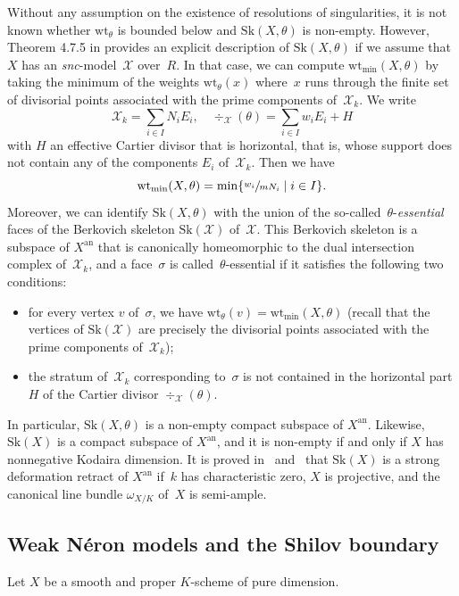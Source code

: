 \documentclass[11pt]{article}
\theoremstyle{definition}
\numberwithin{equation}{subsection}
\newcommand{\cX}{\ensuremath{\mathscr{X}}}
\newcommand{\snc}{\textit{snc}}
\newcommand{\an}{\mathrm{an}}
\newcommand{\Sk}{\mathrm{Sk}}
\newcommand{\wt}{\mathrm{wt}}
\let\form\theta
\begin{document}
Without any assumption on the existence of resolutions of singularities, it is not known whether $\wt_{\form}$ is bounded below and $\Sk(X,\form)$ is non-empty.
However, Theorem 4.7.5 in \cite{MuNi} provides an explicit description of $\Sk(X,\form)$ if we assume that $X$ has an \snc-model~$\cX$ over~$R$.
In that case, we can compute $\wt_{\min}(X,\form)$ by taking the minimum of the weights $\wt_{\form}(x)$ where~$x$ runs through the finite set of divisorial points associated with the prime components of~$\cX_k$. We write
\[
\cX_k=\sum_{i\in I}N_i E_i, \quad \div_{\cX}(\form)=\sum_{i\in I}w_i E_i + H
\]
with $H$ an effective Cartier divisor that is horizontal, that is, whose support does not contain any of the components $E_i$ of~$\cX_k$. Then we have
\[
\wt_{\min}(X,\form)=\min \{\sfrac{w_i}{mN_i}\mid i\in I\}.
\]
Moreover, we can identify $\Sk(X,\form)$ with the union of the so-called~$\form$-{\em essential} faces of the Berkovich skeleton $\Sk(\cX)$ of~$\cX$.
This Berkovich skeleton is a subspace of $X^{\an}$ that is canonically homeomorphic to the dual intersection complex of~$\cX_k$, and a face~$\sigma$ is called~$\form$-essential if it satisfies the following two conditions:
\begin{itemize}
\item for every vertex $v$ of~$\sigma$, we have $\wt_{\form}(v)=\wt_{\min}(X,\form)$ (recall that the vertices of $\Sk(\cX)$ are precisely the divisorial points associated with the prime components of~$\cX_k$);

\item the stratum of~$\cX_k$ corresponding to~$\sigma$ is not contained in the horizontal part $H$ of the Cartier divisor $\div_{\cX}(\form)$.
\end{itemize}
In particular, $\Sk(X,\form)$ is a non-empty compact subspace of $X^{\an}$. Likewise, $\Sk(X)$ is a compact subspace of $X^{\an}$, and it is non-empty if and only if $X$ has nonnegative Kodaira dimension.
It is proved in~\cite[3.3.5]{NiXu} and~\cite[Th.\,24]{KNX} that $\Sk(X)$ is a strong deformation retract of $X^{\an}$ if~$k$ has characteristic zero, $X$ is projective, and the canonical line bundle $\omega_{X/K}$ of~$X$ is semi-ample.

\subsection{Weak Néron models and the Shilov boundary}\label{sec:shilov}
Let $X$ be a smooth and proper $K$\nobreakdash-scheme of pure dimension.
\end{document}
